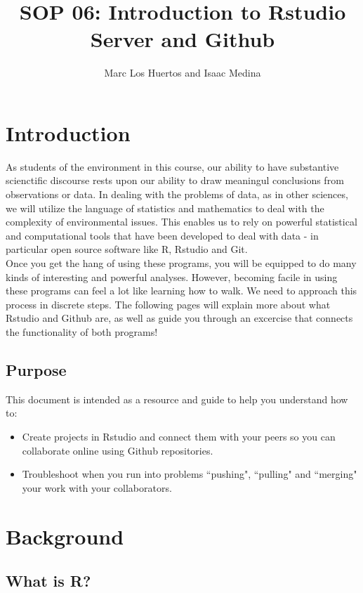 \documentclass{article}\usepackage[]{graphicx}\usepackage[]{color}
\title{SOP 06: Introduction to Rstudio Server and Github}
\author{Marc Los Huertos and Isaac Medina}
\begin{document}
\maketitle

\section{Introduction}
As students of the environment in this course, our ability to have substantive scienctific discourse rests upon our ability to draw meaningul conclusions from observations or data. In dealing with the problems of data, as in other sciences, we will utilize the language of statistics and mathematics to deal with the complexity of environmental issues. This enables us to rely on powerful statistical and computational tools that have been developed to deal with data - in particular open source software like R, Rstudio and Git. \\
Once you get the hang of using these programs, you will be equipped to do many kinds of interesting and powerful analyses. However, becoming facile in using these programs can feel a lot like learning how to walk. We need to approach this process in discrete steps. The following pages will explain more about what Rstudio and Github are, as well as guide you through an excercise that connects the functionality of both programs!

  \subsection{Purpose}
  
This document is intended as a resource and guide to help you understand how to: 
  \begin{itemize}
  \item Create projects in Rstudio and connect them with your peers so you can collaborate online using Github repositories. 
  \item Troubleshoot when you run into problems ``pushing", ``pulling" and ``merging" your work with your collaborators.
  \end{itemize}
\section{Background}

  \subsection{What is R?}
  
\end{document}
